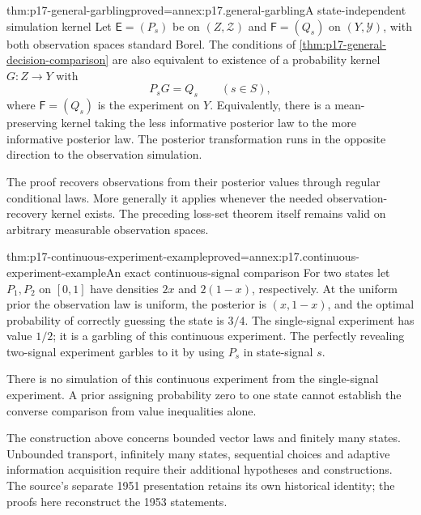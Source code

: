 \begin{hbtheorem}{thm:p17-general-garbling}{proved=annex:p17.general-garbling}{A state-independent simulation kernel}
Let \(\mathsf E=(P_s)\) be on \((Z,\mathcal Z)\) and
\(\mathsf F=(Q_s)\) on \((Y,\mathcal Y)\), with both observation
spaces standard Borel.
The conditions of \cref{thm:p17-general-decision-comparison} are also
equivalent to existence of a probability kernel \(G:Z\to Y\) with
\[
                       P_sG=Q_s\qquad(s\in S),
\]
where \(\mathsf F=(Q_s)\) is the experiment on \(Y\).
Equivalently, there is a mean-preserving kernel taking the less
informative posterior law to the more informative posterior law.
The posterior transformation runs in the opposite direction to the
observation simulation.

The proof recovers observations from their posterior values through
regular conditional laws. More generally it applies whenever the
needed observation-recovery kernel exists. The preceding loss-set
theorem itself remains valid on arbitrary measurable observation spaces.
\end{hbtheorem}

\begin{hbtheorem}{thm:p17-continuous-experiment-example}{proved=annex:p17.continuous-experiment-example}{An exact continuous-signal comparison}
For two states let \(P_1,P_2\) on \([0,1]\) have densities
\(2x\) and \(2(1-x)\), respectively. At the uniform prior the
observation law is uniform, the posterior is \((x,1-x)\), and the
optimal probability of correctly guessing the state is \(3/4\).
The single-signal experiment has value \(1/2\); it is a garbling
of this continuous experiment. The perfectly revealing two-signal
experiment garbles to it by using \(P_s\) in state-signal \(s\).

There is no simulation of this continuous experiment from the
single-signal experiment. A prior assigning probability zero to one
state cannot establish the converse comparison from value inequalities
alone.
\end{hbtheorem}

The construction above concerns bounded vector laws and finitely many
states. Unbounded transport, infinitely many states, sequential choices
and adaptive information acquisition require their additional hypotheses
and constructions. The source's separate 1951 presentation retains its
own historical identity; the proofs here reconstruct the 1953 statements.
